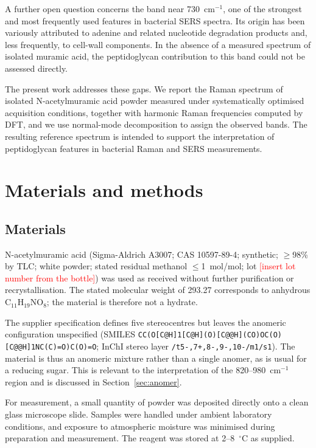 \documentclass[preprint,12pt]{elsarticle}
\newcommand{\wn}{\ensuremath{\mathrm{cm}^{-1}}}
\newcommand{\authorcheck}[1]{\textcolor{red}{[#1]}}
\begin{document}
A further open question concerns the band near 730~\wn{}, one of the
strongest and most frequently used features in bacterial SERS spectra. Its
origin has been variously attributed to adenine and related nucleotide
degradation products \cite{premasiri2016origins,kubryk2016origin} and, less
frequently, to cell-wall components. In the absence of a measured spectrum
of isolated muramic acid, the peptidoglycan contribution to this band could
not be assessed directly.

The present work addresses these gaps. We report the Raman spectrum of
isolated N-acetylmuramic acid powder measured under systematically
optimised acquisition conditions, together with harmonic Raman frequencies
computed by DFT, and we use normal-mode decomposition to assign the observed
bands. The resulting reference spectrum is intended to support the
interpretation of peptidoglycan features in bacterial Raman and SERS
measurements.

\section{Materials and methods}

\subsection{Materials}

N-acetylmuramic acid (Sigma-Aldrich A3007; CAS 10597-89-4; synthetic;
$\geq$98\% by TLC; white powder; stated residual methanol $\leq$1~mol/mol;
lot \authorcheck{insert lot number from the bottle}) was used as received
without further purification or recrystallisation. The stated molecular weight
of 293.27 corresponds to anhydrous C$_{11}$H$_{19}$NO$_8$; the material is
therefore not a hydrate.

The supplier specification defines five stereocentres but leaves the anomeric
configuration unspecified (SMILES
\texttt{CC(O[C@H]1[C@H](O)[C@@H](CO)OC(O)[C@@H]1NC(C)=O)C(O)=O};
InChI stereo layer \texttt{/t5-,7+,8-,9-,10-/m1/s1}). The material is thus an
anomeric mixture rather than a single anomer, as is usual for a reducing sugar.
This is relevant to the interpretation of the 820--980~\wn{} region and is
discussed in Section~\ref{sec:anomer}.

For measurement, a small quantity of powder was deposited directly onto a clean
glass microscope slide. Samples were handled under ambient laboratory
conditions, and exposure to atmospheric moisture was minimised during
preparation and measurement. The reagent was stored at 2--8~$^\circ$C as
supplied.
\end{document}
